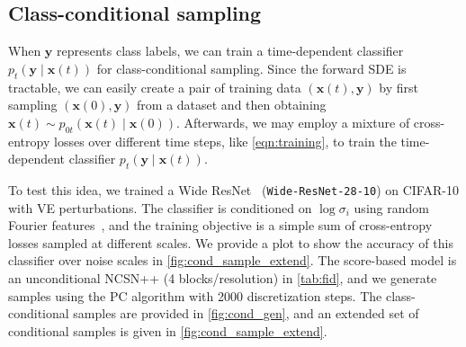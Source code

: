 \documentclass{article} %
\newcommand{\bfx}{\mathbf{x}}
\newcommand{\bfy}{\mathbf{y}}
\begin{document}
\subsection{Class-conditional sampling}\label{app:class_cond_sampling}
When $\bfy$ represents class labels, we can train a time-dependent classifier $p_t(\bfy \mid \bfx(t))$ for class-conditional sampling. Since the forward SDE is tractable, we can easily create a pair of training data $(\bfx(t), \bfy)$ by first sampling $(\bfx(0), \bfy)$ from a dataset and then obtaining $\bfx(t) \sim p_{0t}(\bfx(t) \mid \bfx(0))$. Afterwards, we may employ a mixture of cross-entropy losses over different time steps, like \cref{eqn:training}, to train the time-dependent classifier $p_t(\bfy \mid \bfx(t))$.

To test this idea, we trained a Wide ResNet~\citep{zagoruyko2016wide} (\verb|Wide-ResNet-28-10|) on CIFAR-10 with VE perturbations. The classifier is conditioned on $\log \sigma_i$ using random Fourier features~\citep{tancik2020fourfeat}, and the training objective is a simple sum of cross-entropy losses sampled at different scales. We provide a plot to show the accuracy of this classifier over noise scales in \cref{fig:cond_sample_extend}. The score-based model is an unconditional NCSN++ (4 blocks/resolution) in \cref{tab:fid}, and we generate samples using the PC algorithm with 2000 discretization steps. The class-conditional samples are provided in \cref{fig:cond_gen}, and an extended set of conditional samples is given in \cref{fig:cond_sample_extend}.
\end{document}
